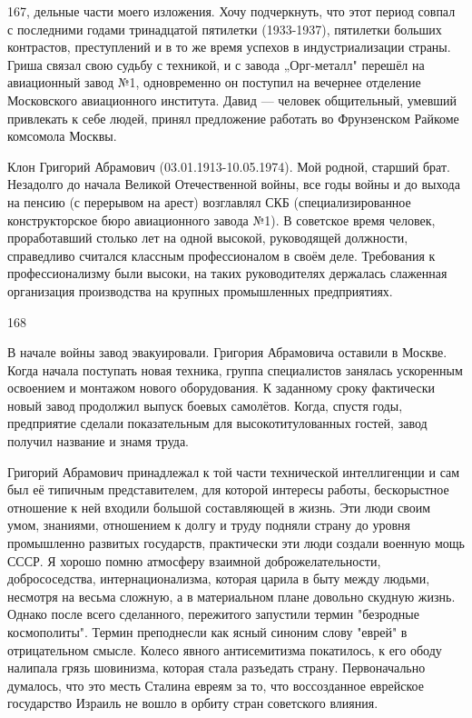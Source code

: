 167, дельные части моего изложения. Хочу подчеркнуть, что этот период совпал с последними годами тринадцатой пятилетки (1933-1937), пятилетки больших контрастов, преступлений и в то же время успехов в индустриализации страны. Гриша связал свою судьбу с техникой, и с завода „Орг-металл" перешёл на авиационный завод №1, одновременно он поступил на вечернее отделение Московского авиационного института. Давид — человек общительный, умевший привлекать к себе людей, принял предложение работать во Фрунзенском Райкоме комсомола Москвы.

Клон Григорий Абрамович (03.01.1913-10.05.1974). Мой родной, старший брат. Незадолго до начала Великой Отечественной войны, все годы войны и до выхода на пенсию (с перерывом на арест) возглавлял СКБ (специализированное конструкторское бюро авиационного завода №1). В советское время человек, проработавший столько лет на одной высокой, руководящей должности, справедливо считался классным профессионалом в своём деле. Требования к профессионализму были высоки, на таких руководителях держалась слаженная организация производства на крупных промышленных предприятиях.

168

В начале войны завод эвакуировали. Григория Абрамовича оставили в Москве. Когда начала поступать новая техника, группа специалистов занялась ускоренным освоением и монтажом нового оборудования. К заданному сроку фактически новый завод продолжил выпуск боевых самолётов. Когда, спустя годы, предприятие сделали показательным для высокотитулованных гостей, завод получил название и знамя труда.

Григорий Абрамович принадлежал к той части технической интеллигенции и сам был её типичным представителем, для которой интересы работы, бескорыстное отношение к ней входили большой составляющей в жизнь. Эти люди своим умом, знаниями, отношением к долгу и труду подняли страну до уровня промышленно развитых государств, практически эти люди создали военную мощь СССР. Я хорошо помню атмосферу взаимной доброжелательности, добрососедства, интернационализма, которая царила в быту между людьми, несмотря на весьма сложную, а в материальном плане довольно скудную жизнь. Однако после всего сделанного, пережитого запустили термин "безродные космополиты". Термин преподнесли как ясный синоним слову "еврей" в отрицательном смысле. Колесо явного антисемитизма покатилось, к его ободу налипала грязь шовинизма, которая стала разъедать страну. Первоначально думалось, что это месть Сталина евреям за то, что воссозданное еврейское государство Израиль не вошло в орбиту стран советского влияния.

